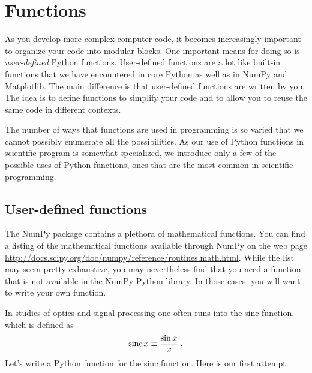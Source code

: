 \documentclass[letterpaper,10pt,english]{sphinxmanual}
\begin{document}
\chapter{Functions}
\label{chap7/chap7_funcs:chap7}\label{chap7/chap7_funcs:functions}\label{chap7/chap7_funcs::doc}
As you develop more complex computer code, it becomes increasingly important to organize your code into modular blocks.  One important means for doing so is  \emph{user-defined} Python functions.  User-defined functions are a lot like built-in functions that we have encountered in core Python as well as in NumPy and Matplotlib.  The main difference is that user-defined functions are written by you.  The idea is to define functions to simplify your code and to allow you to reuse the same code in different contexts.

The number of ways that functions are used in programming is so varied that we cannot possibly enumerate all the possibilities.  As our use of Python functions in scientific program is somewhat specialized, we introduce only a few of the possible uses of Python functions, ones that are the most common in scientific programming.


\section{User-defined functions}
\label{chap7/chap7_funcs:userdefdfuncs}\label{chap7/chap7_funcs:user-defined-functions}\label{chap7/chap7_funcs:index-0}
The NumPy package contains a plethora of mathematical functions.  You can find a listing of the mathematical functions available through NumPy on the web page \href{http://docs.scipy.org/doc/numpy/reference/routines.math.html}{http://docs.scipy.org/doc/numpy/reference/routines.math.html}.  While the list may seem pretty exhaustive, you may nevertheless find that you need a function that is not available in the NumPy Python library.  In those cases, you will want to write your own function.

In studies of optics and signal processing one often runs into the sinc function, which is defined as
\begin{gather}
\begin{split}\mathrm{sinc}\,x \equiv \frac{\sin x}{x} \;.\end{split}\notag
\end{gather}
Let's write a Python function for the sinc function.  Here is our first attempt:
\end{document}
